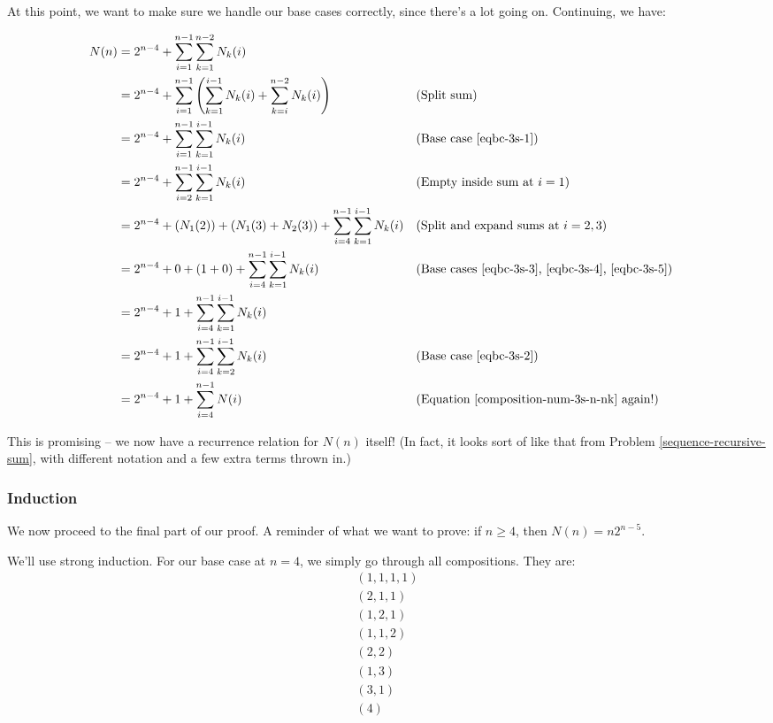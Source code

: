 
At this point, we want to make sure we handle our base cases correctly, since there's a lot going on. Continuing, we have:

\begin{align*}
N(n) &= 2^{n-4} + \sum_{i=1}^{n-1} \sum_{k=1}^{n-2} N_{k}(i) \\
&= 2^{n-4} + \sum_{i=1}^{n-1} \left( \sum_{k=1}^{i-1} N_{k}(i) + \sum_{k=i}^{n-2} N_{k}(i) \right) && \text{(Split sum)} \\
&= 2^{n-4} + \sum_{i=1}^{n-1} \sum_{k=1}^{i-1} N_{k}(i) && \text{(Base case \ref{eqbc-3s-1})} \\
&= 2^{n-4} + \sum_{i=2}^{n-1} \sum_{k=1}^{i-1} N_{k}(i) && \text{(Empty inside sum at $i=1$)} \\
&= 2^{n-4} + \left( N_1(2) \right) + \left( N_1(3) + N_2(3) \right) + \sum_{i=4}^{n-1} \sum_{k=1}^{i-1} N_{k}(i) && \text{(Split and expand sums at $i=2,3$)} \\
&= 2^{n-4} + 0 + \left( 1 + 0 \right) + \sum_{i=4}^{n-1} \sum_{k=1}^{i-1} N_{k}(i) && \text{(Base cases \ref{eqbc-3s-3}, \ref{eqbc-3s-4}, \ref{eqbc-3s-5})} \\
&= 2^{n-4} + 1 + \sum_{i=4}^{n-1} \sum_{k=1}^{i-1} N_{k}(i) \\
&= 2^{n-4} + 1 + \sum_{i=4}^{n-1} \sum_{k=2}^{i-1} N_{k}(i) && \text{(Base case \ref{eqbc-3s-2})} \\
&= 2^{n-4} + 1 + \sum_{i=4}^{n-1} N(i) && \text{(Equation \ref{composition-num-3s-n-nk} again!)} \\
\end{align*}

This is promising -- we now have a recurrence relation for $N(n)$ itself! (In fact, it looks sort of like that from Problem \ref{sequence-recursive-sum}, with different notation and a few extra terms thrown in.)


\subsubsection{Induction}

We now proceed to the final part of our proof. A reminder of what we want to prove: if $n \geq 4$, then $N(n) = n2^{n-5}$.

We'll use strong induction. For our base case at $n = 4$, we simply go through all compositions. They are:
\begin{gather*}
(1, 1, 1, 1) \\
(2, 1, 1) \\
(1, 2, 1) \\
(1, 1, 2) \\
(2, 2) \\
(1, 3) \\
(3, 1) \\
(4)
\end{gather*}

